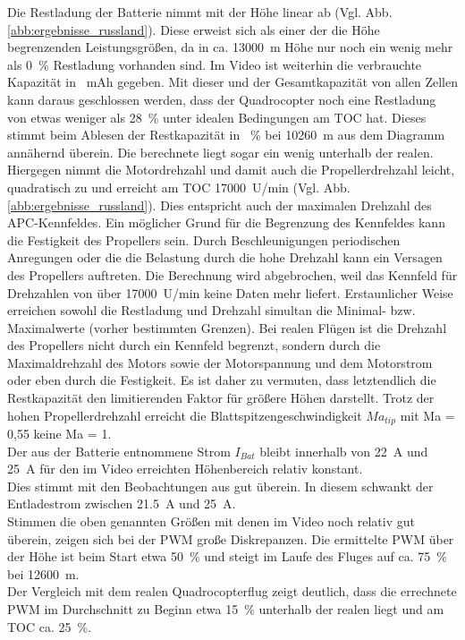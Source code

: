 Die Restladung der Batterie nimmt mit der Höhe linear ab (Vgl. Abb.\ref{abb:ergebnisse_russland}). Diese erweist sich als einer der die Höhe begrenzenden Leistungsgrößen, da in ca. \SI{13000}{m} Höhe nur noch ein wenig mehr als \SI{0}{\%} Restladung vorhanden sind. Im Video ist weiterhin die verbrauchte Kapazität in \SI{}{mAh} gegeben. Mit dieser und der Gesamtkapazität von allen Zellen kann daraus geschlossen werden, dass der Quadrocopter noch eine Restladung von etwas weniger als \SI{28}{\%} unter idealen Bedingungen am TOC hat. Dieses stimmt beim Ablesen der Restkapazität in \SI{}{\%} bei \SI{10260}{m} aus dem Diagramm annähernd überein. Die berechnete liegt sogar ein wenig unterhalb der realen. \\
Hiergegen nimmt die Motordrehzahl und damit auch die Propellerdrehzahl leicht, quadratisch zu und erreicht am TOC \SI{17000}{U/min} (Vgl. Abb.\ref{abb:ergebnisse_russland}).  
Dies entspricht auch der maximalen Drehzahl des APC-Kennfeldes. Ein möglicher Grund für die Begrenzung des Kennfeldes kann die Festigkeit des Propellers sein. Durch Beschleunigungen periodischen Anregungen oder die die Belastung durch die hohe Drehzahl kann ein Versagen des Propellers auftreten. Die Berechnung wird abgebrochen, weil das Kennfeld für Drehzahlen von über \SI{17000}{U/min} keine Daten mehr liefert. Erstaunlicher Weise erreichen sowohl die Restladung und Drehzahl simultan die Minimal- bzw. Maximalwerte (vorher bestimmten Grenzen). Bei realen Flügen ist die Drehzahl des Propellers nicht durch ein Kennfeld begrenzt, sondern durch die Maximaldrehzahl des Motors sowie der Motorspannung und dem Motorstrom oder eben durch die Festigkeit. Es ist daher zu vermuten, dass letztendlich die Restkapazität den limitierenden Faktor für größere Höhen darstellt. Trotz der hohen Propellerdrehzahl erreicht die Blattspitzengeschwindigkeit \ensuremath{Ma_{tip}} mit Ma = 0,55 keine Ma = 1. \\
Der aus der Batterie entnommene Strom \ensuremath{I_{Bat}} bleibt innerhalb von \SI{22}{A} und \SI{25}{A} für den im Video erreichten Höhenbereich relativ konstant. \\
Dies stimmt mit den Beobachtungen aus \cite{Anderson.2018} gut überein. In diesem schwankt der Entladestrom zwischen \SI{21,5}{A} und \SI{25}{A}. \\
Stimmen die oben genannten Größen mit denen im Video noch relativ gut überein, zeigen sich bei der PWM große Diskrepanzen. Die ermittelte PWM über der Höhe ist beim Start etwa \SI{50}{\%} und steigt im Laufe des Fluges auf ca. \SI{75}{\%} bei \SI{12600}{m}. \\
Der Vergleich mit dem realen Quadrocopterflug zeigt deutlich, dass die errechnete PWM im Durchschnitt zu Beginn etwa \SI{15}{\%} unterhalb der realen liegt und am TOC ca. \SI{25}{\%}.



